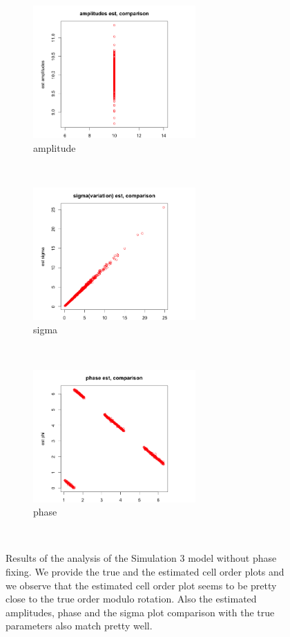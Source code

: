 \documentclass[11pt]{article}
\begin{document}
\begin{figure}[ht]
     \begin{subfigure}[t]{0.5\textwidth}
        \centering
        \includegraphics[height=2in]{../figures/cell_order_R_figs/amp_compare_sim3.png}
        \caption{amplitude}
    \end{subfigure}%
    ~
       \begin{subfigure}[t]{0.5\textwidth}
        \centering
        \includegraphics[height=2in]{../figures/cell_order_R_figs/sigma_compare_sim3.png}
        \caption{sigma}
    \end{subfigure}\\
    
     \begin{subfigure}[t]{0.5\textwidth}
        \centering
        \includegraphics[height=2in]{../figures/cell_order_R_figs/phase_compare_sim3.png}
        \caption{phase}
    \end{subfigure}\\
    
    \caption{Results of the analysis of the Simulation 3 model without phase fixing. We provide the true and the estimated cell order plots and we observe that the estimated cell order plot seems to be pretty close to the true order modulo rotation. Also the estimated amplitudes, phase and the sigma plot comparison with the true parameters also match pretty well.}
 \label{fig:fig8}
 \end{figure}
\end{document}
